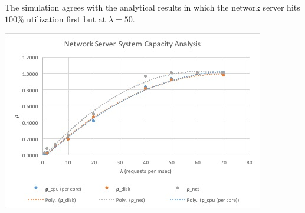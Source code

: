 \documentclass{article}   	                         %
\begin{document}
\begin{enumerate}[(a)]
\begin{center}
\end{center}
The simulation agrees with the analytical results in which the network server hits $100\%$ utilization first but at $\lambda = 50$.
\begin{center}
\includegraphics[scale = 0.8]{Figure4.jpg}
\end{center}
 
\end{enumerate}
\end{document}
